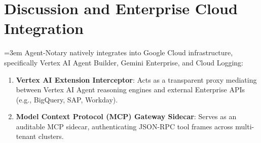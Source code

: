 \documentclass[conference,10pt]{IEEEtran}
\begin{document}
\section{Discussion and Enterprise Cloud Integration}
{\emergencystretch=3em
Agent-Notary natively integrates into Google Cloud infrastructure, specifically Vertex AI Agent Builder, Gemini Enterprise, and Cloud Logging:
\begin{enumerate}
    \item \textbf{Vertex AI Extension Interceptor}: Acts as a transparent proxy mediating between Vertex AI Agent reasoning engines and external Enterprise APIs (e.g., BigQuery, SAP, Workday).
    \item \textbf{Model Context Protocol (MCP) Gateway Sidecar}: Serves as an auditable MCP sidecar, authenticating JSON-RPC tool frames across multi-tenant clusters.

\end{enumerate}}
\end{document}
